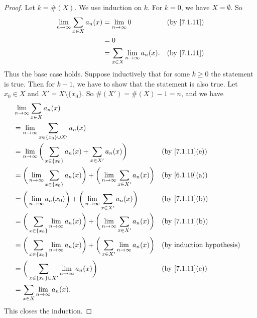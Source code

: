 \begin{proof}
  Let \(k = \#(X)\).
  We use induction on \(k\).
  For \(k = 0\), we have \(X = \emptyset\).
  So
  \begin{align*}
    \lim_{n \to \infty} \sum_{x \in X} a_n(x) & = \lim_{n \to \infty} 0                      &  & \text{(by \cref{7.1.11})} \\
                                              & = 0                                                                         \\
                                              & = \sum_{x \in X} \lim_{n \to \infty} a_n(x). &  & \text{(by \cref{7.1.11})}
  \end{align*}
  Thus the base case holds.
  Suppose inductively that for some \(k \geq 0\) the statement is true.
  Then for \(k + 1\), we have to show that the statement is also true.
  Let \(x_0 \in X\) and \(X' = X \setminus \{x_0\}\).
  So \(\#(X') = \#(X) - 1 = n\), and we have
  \begin{align*}
     & \lim_{n \to \infty} \sum_{x \in X} a_n(x)                                                                                                                    \\
     & = \lim_{n \to \infty} \sum_{x \in \{x_0\} \cup X'} a_n(x)                                                                                                    \\
     & = \lim_{n \to \infty} \bigg(\sum_{x \in \{x_0\}} a_n(x) + \sum_{x \in X'} a_n(x)\bigg)                                 &  & \text{(by \cref{7.1.11}(e))}     \\
     & = \bigg(\lim_{n \to \infty} \sum_{x \in \{x_0\}} a_n(x)\bigg) + \bigg(\lim_{n \to \infty} \sum_{x \in X'} a_n(x)\bigg) &  & \text{(by \cref{6.1.19}(a))}     \\
     & = \bigg(\lim_{n \to \infty} a_n(x_0)\bigg) + \bigg(\lim_{n \to \infty} \sum_{x \in X'} a_n(x)\bigg)                    &  & \text{(by \cref{7.1.11}(b))}     \\
     & = \bigg(\sum_{x \in \{x_0\}} \lim_{n \to \infty} a_n(x)\bigg) + \bigg(\lim_{n \to \infty} \sum_{x \in X'} a_n(x)\bigg) &  & \text{(by \cref{7.1.11}(b))}     \\
     & = \bigg(\sum_{x \in \{x_0\}} \lim_{n \to \infty} a_n(x)\bigg) + \bigg(\sum_{x \in X'} \lim_{n \to \infty} a_n(x)\bigg) &  & \text{(by induction hypothesis)} \\
     & = \bigg(\sum_{x \in \{x_0\} \cup X'} \lim_{n \to \infty} a_n(x)\bigg)                                                  &  & \text{(by \cref{7.1.11}(e))}     \\
     & = \sum_{x \in X} \lim_{n \to \infty} a_n(x).
  \end{align*}
  This closes the induction.
\end{proof}